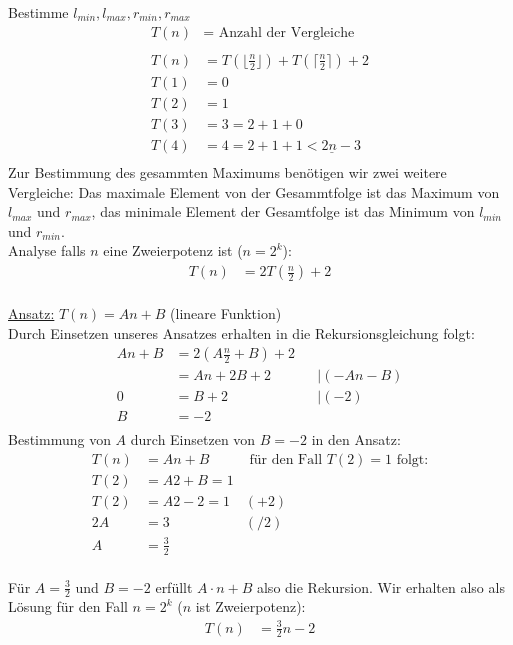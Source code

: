 Bestimme $l_{min},l_{max}, r_{min}, r_{max}$\\
\begin{align*}
    T(n)&= \text{ Anzahl der Vergleiche}\\
    \\
    T(n)&=T(\lfloor \frac{n}{2}\rfloor) + T( \lceil \frac{n}{2}\rceil) +2 \\
    T(1)&=0\\
    T(2)&=1\\
    T(3)&=3=2+1+0\\
    T(4)&=4=2+1+1 \underline{< 2n-3}\\
\end{align*}
Zur Bestimmung des gesammten Maximums benötigen wir zwei weitere Vergleiche: Das maximale Element von der Gesammtfolge ist das Maximum von $l_{max}$ und $r_{max}$, das minimale Element der Gesamtfolge ist das Minimum von $l_{min}$ und $r_{min}$.\\

Analyse falls $n$ eine Zweierpotenz ist ($n=2^k$):\\
\begin{align*}
    T(n)&= 2T(\frac{n}{2})+2\\
\end{align*}

\underline{Ansatz:} $T(n) = A n +B$ (lineare Funktion)\\
Durch Einsetzen unseres Ansatzes erhalten in die Rekursionsgleichung folgt:\\
\begin{align*}
    An+B&=2(A\frac{n}{2}+B)+2\\
        &=An+2B+2 &&|(-An-B)\\
    0&=B+2 &&|(-2)\\
    B&=-2\\
\end{align*}
Bestimmung von $A$ durch Einsetzen von $B=-2$ in den Ansatz:\\
\begin{align*}
    T(n)&=An+B &\text{ für den Fall }T(2)=1\text{ folgt:}\\
    T(2)&=A2+B=1 \\
    T(2)&=A2-2=1 &(+2)\\
    2A&=3 & (/2)\\
    A&=\frac{3}{2}\\
\end{align*}

Für $A=\frac{3}{2}$ und $B=-2$ erfüllt $A\cdot n +B$ also die Rekursion.
Wir erhalten also als Lösung für den Fall $n=2^k$ ($n$ ist Zweierpotenz):
\begin{align*}
T(n)&=\frac{3}{2}n-2\\
\end{align*}

